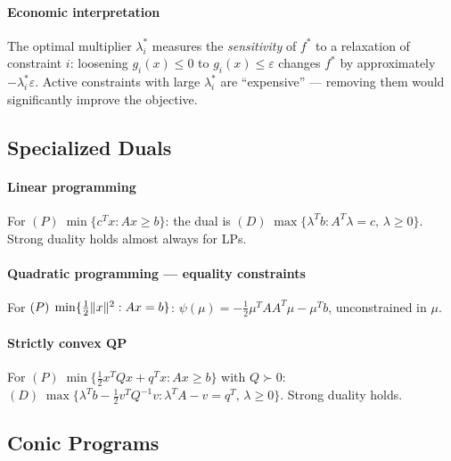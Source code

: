 \paragraph{Economic interpretation}

The optimal multiplier $\lambda_i^*$ measures the \textit{sensitivity} of $f^*$ to a relaxation of constraint $i$: loosening $g_i(x) \leq 0$ to $g_i(x) \leq \varepsilon$ changes $f^*$ by approximately $-\lambda_i^* \varepsilon$.
Active constraints with large $\lambda_i^*$ are ``expensive'' --- removing them would significantly improve the objective.


\subsection{Specialized Duals}\label{ssec:specialized-duals}

\paragraph{Linear programming}

For $(P)\; \min\{c^T x : Ax \geq b\}$: the dual is $(D)\; \max\{\lambda^T b : A^T\lambda = c,\, \lambda \geq 0\}$.
Strong duality holds almost always for LPs.

\paragraph{Quadratic programming --- equality constraints}

For $(P)\; \min\{\frac{1}{2}\lVert x\rVert^2 : Ax = b\}$: $\psi(\mu) = -\frac{1}{2}\mu^T AA^T\mu - \mu^T b$, unconstrained in $\mu$.

\paragraph{Strictly convex QP}

For $(P)\; \min\{\frac{1}{2}x^T Qx + q^T x : Ax \geq b\}$ with $Q \succ 0$:
$(D)\; \max\{\lambda^T b - \frac{1}{2}v^T Q^{-1}v : \lambda^T A - v = q^T,\, \lambda \geq 0\}$.
Strong duality holds.


\subsection{Conic Programs}\label{ssec:conic}

